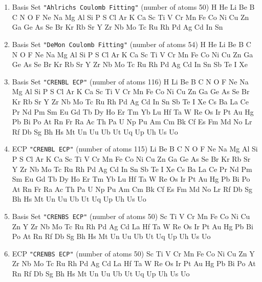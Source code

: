 \begin{enumerate}
\item Basis Set \verb#"Ahlrichs Coulomb Fitting"# (number of atoms 50)  \newline 
  H He Li Be B C N O F Ne Na Mg Al Si P S Cl Ar K Ca Sc Ti V Cr Mn
 Fe Co Ni Cu Zn Ga Ge As Se Br Kr Rb Sr Y Zr Nb Mo Tc Ru Rh Pd Ag Cd In Sn



\item Basis Set \verb#"DeMon Coulomb Fitting"# (number of atoms 54)  \newline 
  H He Li Be B C N O F Ne Na Mg Al Si P S Cl Ar K Ca Sc Ti V Cr Mn
 Fe Co Ni Cu Zn Ga Ge As Se Br Kr Rb Sr Y Zr Nb Mo Tc Ru Rh Pd Ag Cd In Sn
 Sb Te I Xe


\item Basis Set \verb#"CRENBL ECP"# (number of atoms 116)  \newline 
  H Li Be B C N O F Ne Na Mg Al Si P S Cl Ar K Ca Sc Ti V Cr Mn Fe
 Co Ni Cu Zn Ga Ge As Se Br Kr Rb Sr Y Zr Nb Mo Tc Ru Rh Pd Ag Cd In Sn Sb
 Te I Xe Cs Ba La Ce Pr Nd Pm Sm Eu Gd Tb Dy Ho Er Tm Yb Lu Hf Ta W Re Os
 Ir Pt Au Hg Pb Bi Po At Rn Fr Ra Ac Th Pa U Np Pu Am Cm Bk Cf Es Fm Md No
 Lr Rf Db Sg Bh Hs Mt Un Uu Ub Ut Uq Up Uh Us Uo


\item ECP \verb#"CRENBL ECP"# (number of atoms 115)  \newline 
  Li Be B C N O F Ne Na Mg Al Si P S Cl Ar K Ca Sc Ti V Cr Mn Fe Co
 Ni Cu Zn Ga Ge As Se Br Kr Rb Sr Y Zr Nb Mo Tc Ru Rh Pd Ag Cd In Sn Sb Te
 I Xe Cs Ba La Ce Pr Nd Pm Sm Eu Gd Tb Dy Ho Er Tm Yb Lu Hf Ta W Re Os Ir
 Pt Au Hg Pb Bi Po At Rn Fr Ra Ac Th Pa U Np Pu Am Cm Bk Cf Es Fm Md No Lr
 Rf Db Sg Bh Hs Mt Un Uu Ub Ut Uq Up Uh Us Uo


\item Basis Set \verb#"CRENBS ECP"# (number of atoms 50)  \newline 
  Sc Ti V Cr Mn Fe Co Ni Cu Zn Y Zr Nb Mo Tc Ru Rh Pd Ag Cd La Hf Ta W Re
 Os Ir Pt Au Hg Pb Bi Po At Rn Rf Db Sg Bh Hs Mt Un Uu Ub Ut Uq Up Uh Us Uo



\item ECP \verb#"CRENBS ECP"# (number of atoms 50)  \newline 
  Sc Ti V Cr Mn Fe Co Ni Cu Zn Y Zr Nb Mo Tc Ru Rh Pd Ag Cd La Hf Ta W Re
 Os Ir Pt Au Hg Pb Bi Po At Rn Rf Db Sg Bh Hs Mt Un Uu Ub Ut Uq Up Uh Us Uo



\end{enumerate}

\fussy

